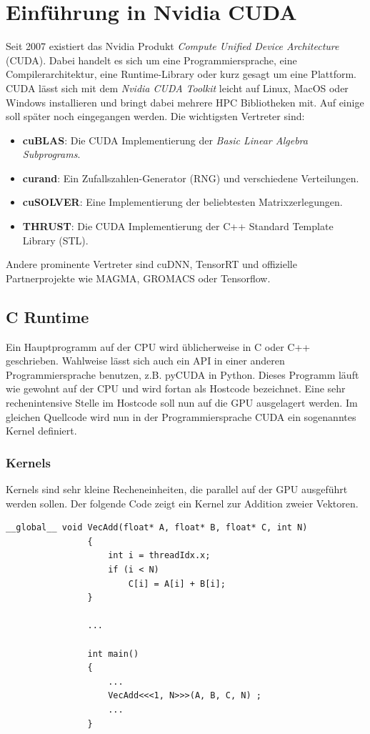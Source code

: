 	\chapter{Einf\"uhrung in Nvidia CUDA}
	Seit 2007 existiert das Nvidia Produkt \textit{Compute Unified Device Architecture} (CUDA). Dabei handelt es sich um eine Programmiersprache, eine Compilerarchitektur, eine Runtime-Library oder kurz gesagt um eine Plattform. CUDA lässt sich mit dem \textit{Nvidia CUDA Toolkit} leicht auf Linux, MacOS oder Windows installieren und bringt dabei mehrere HPC Bibliotheken mit. Auf einige soll später noch eingegangen werden. Die wichtigsten Vertreter sind:
	\begin{itemize}
		\item \textbf{cuBLAS}:   Die CUDA Implementierung der \textit{Basic Linear Algebra Subprograms}.
		\item \textbf{curand}:   Ein Zufallszahlen-Generator (RNG) und verschiedene Verteilungen.
		\item \textbf{cuSOLVER}: Eine Implementierung der beliebtesten Matrixzerlegungen.
		\item \textbf{THRUST}:   Die CUDA Implementierung der C++ Standard Template Library (STL).
	\end{itemize}
	Andere prominente Vertreter sind cuDNN, TensorRT und offizielle Partnerprojekte wie MAGMA, GROMACS oder Tensorflow.
				
		
		\section{C Runtime}
		Ein Hauptprogramm auf der CPU wird üblicherweise in C oder C++ geschrieben. Wahlweise lässt sich auch ein \Gls{API} in einer anderen Programmiersprache benutzen, z.B. pyCUDA in Python. Dieses Programm läuft wie gewohnt auf der CPU und wird fortan als Hostcode bezeichnet. Eine sehr rechenintensive Stelle im  Hostcode soll nun auf die GPU ausgelagert werden. Im gleichen Quellcode wird nun in der Programmiersprache CUDA ein sogenanntes \Gls{Kernel} definiert.
			\subsection*{Kernels}
			\Glspl{Kernel} sind sehr kleine Recheneinheiten, die parallel auf der GPU ausgeführt werden sollen. Der folgende Code zeigt ein \Gls{Kernel} zur Addition zweier Vektoren.
	  		\begin{lstlisting}[caption=Vektoraddition Kernel]
				__global__ void VecAdd(float* A, float* B, float* C, int N)
				{
    				int i = threadIdx.x;
    				if (i < N)
        				C[i] = A[i] + B[i];
				}
				
				...
				
				int main()
				{		
					...
					VecAdd<<<1, N>>>(A, B, C, N) ;
					...
				}
			\end{lstlisting}
			

